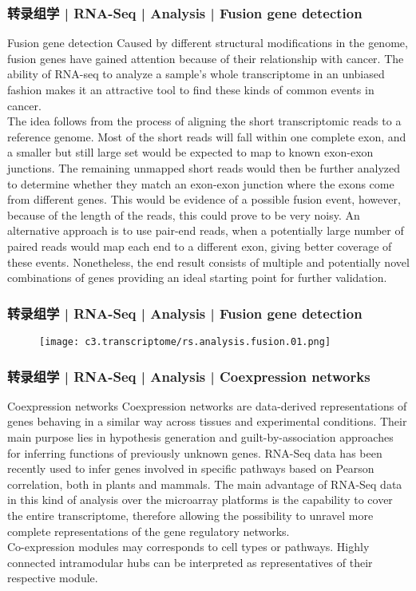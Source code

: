 \begin{frame}
  \frametitle{转录组学 | RNA-Seq | Analysis | Fusion gene detection}
  {\footnotesize
  \begin{block}{Fusion gene detection}
  Caused by different structural modifications in the genome, fusion genes have gained attention because of their relationship with cancer. The ability of RNA-seq to analyze a sample's whole transcriptome in an unbiased fashion makes it an attractive tool to find these kinds of common events in cancer.\\
  \vspace{0.5em}
  The idea follows from the process of aligning the short transcriptomic reads to a reference genome. Most of the short reads will fall within one complete exon, and a smaller but still large set would be expected to map to known exon-exon junctions. The remaining unmapped short reads would then be further analyzed to determine whether they match an exon-exon junction where the exons come from different genes. This would be evidence of a possible fusion event, however, because of the length of the reads, this could prove to be very noisy. An alternative approach is to use pair-end reads, when a potentially large number of paired reads would map each end to a different exon, giving better coverage of these events. Nonetheless, the end result consists of multiple and potentially novel combinations of genes providing an ideal starting point for further validation.
  \end{block}
  }
\end{frame}

\begin{frame}
  \frametitle{转录组学 | RNA-Seq | Analysis | Fusion gene detection}
  \begin{figure}
    \centering
    \texttt{[image: c3.transcriptome/rs.analysis.fusion.01.png]}
  \end{figure}
\end{frame}

\begin{frame}
  \frametitle{转录组学 | RNA-Seq | Analysis | Coexpression networks}
  \begin{block}{Coexpression networks}
    Coexpression networks are data-derived representations of genes behaving in a similar way across tissues and experimental conditions. Their main purpose lies in hypothesis generation and guilt-by-association approaches for inferring functions of previously unknown genes. RNA-Seq data has been recently used to infer genes involved in specific pathways based on Pearson correlation, both in plants and mammals. The main advantage of RNA-Seq data in this kind of analysis over the microarray platforms is the capability to cover the entire transcriptome, therefore allowing the possibility to unravel more complete representations of the gene regulatory networks.\\
 \vspace{0.5em}
 Co-expression modules may corresponds to cell types or pathways. Highly connected intramodular hubs can be interpreted as representatives of their respective module.
  \end{block}
\end{frame}

